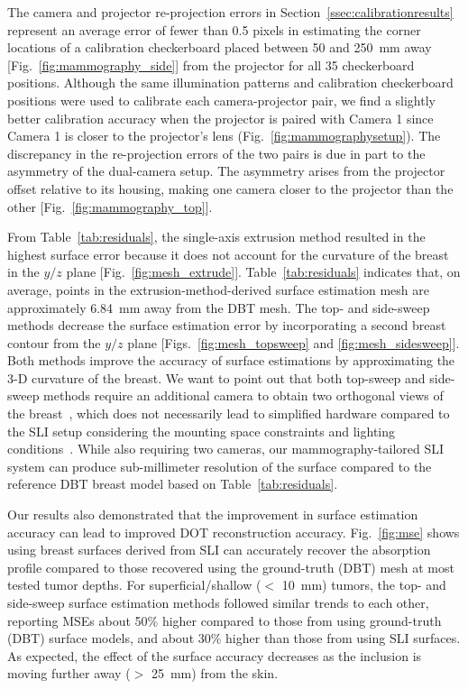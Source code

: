 The camera and projector re-projection errors in Section~\ref{ssec:calibrationresults} represent an average error of fewer than 0.5 pixels in estimating the corner locations of a calibration checkerboard placed between 50 and 250~mm away [Fig.~\ref{fig:mammography_side}] from the projector for all 35 checkerboard positions. Although the same illumination patterns and calibration checkerboard positions were used to calibrate each camera-projector pair, we find a slightly better calibration accuracy when the projector is paired with Camera 1 since Camera 1 is closer to the projector's lens (Fig.~\ref{fig:mammographysetup}). The discrepancy in the re-projection errors of the two pairs is due in part to the asymmetry of the dual-camera setup. The asymmetry arises from the projector offset relative to its housing, making one camera closer to the projector than the other [Fig.~\ref{fig:mammography_top}]. 

From Table~\ref{tab:residuals}, the single-axis extrusion method resulted in the highest surface error because it does not account for the curvature of the breast in the $y/z$ plane [Fig.~\ref{fig:mesh_extrude}]. Table~\ref{tab:residuals} indicates that, on average, points in the extrusion-method-derived surface estimation mesh are approximately 6.84~mm away from the DBT mesh. The top- and side-sweep methods decrease the surface estimation error by incorporating a second breast contour from the $y/z$ plane [Figs.~\ref{fig:mesh_topsweep} and \ref{fig:mesh_sidesweep}]. Both methods improve the accuracy of surface estimations by approximating the 3-D curvature of the breast. We want to point out that both top-sweep and side-sweep methods require an additional camera to obtain two orthogonal views of the breast~\cite{Pinto2020}, which does not necessarily lead to simplified hardware compared to the SLI setup considering the mounting space constraints and lighting conditions~\cite{Rodriguez2017}. While also requiring two cameras, our mammography-tailored SLI system can produce sub-millimeter resolution of the surface compared to the reference DBT breast model based on Table~\ref{tab:residuals}.

Our results also demonstrated that the improvement in surface estimation accuracy can lead to improved DOT reconstruction accuracy. Fig.~\ref{fig:mse} shows using breast surfaces derived from SLI can accurately recover the absorption profile compared to those recovered using the ground-truth (DBT) mesh at most tested tumor depths. For superficial/shallow ($<$ 10~mm) tumors, the top- and side-sweep surface estimation methods followed similar trends to each other, reporting MSEs about 50\% higher compared to those from using ground-truth (DBT) surface models, and about 30\% higher than those from using SLI surfaces. As expected, the effect of the surface accuracy decreases as the inclusion is moving further away ($>$ 25~mm) from the skin.

